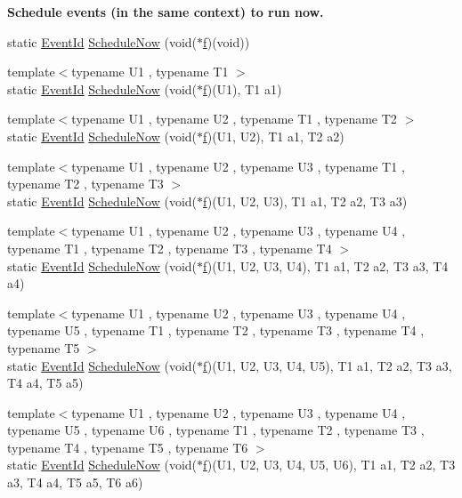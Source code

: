 \begin{Indent}{\bf Schedule events (in the same context) to run now.}
\begin{DoxyCompactItemize}
\item 
static \hyperlink{classns3_1_1EventId}{Event\+Id} \hyperlink{classns3_1_1Simulator_a2eb3f0a7ae370cc88a0dd3416a54a77c}{Schedule\+Now} (void($\ast$\hyperlink{80211b_8c_ae7ffc1a8f84fa47a0812b2f2b9627132}{f})(void))
\item 
{\footnotesize template$<$typename U1 , typename T1 $>$ }\\static \hyperlink{classns3_1_1EventId}{Event\+Id} \hyperlink{classns3_1_1Simulator_a1f80a7e89f6f5aa492f3f58d1d8c5e8e}{Schedule\+Now} (void($\ast$\hyperlink{80211b_8c_ae7ffc1a8f84fa47a0812b2f2b9627132}{f})(U1), T1 a1)
\item 
{\footnotesize template$<$typename U1 , typename U2 , typename T1 , typename T2 $>$ }\\static \hyperlink{classns3_1_1EventId}{Event\+Id} \hyperlink{classns3_1_1Simulator_ae917d38b9c52c0534c6c06ea944aa389}{Schedule\+Now} (void($\ast$\hyperlink{80211b_8c_ae7ffc1a8f84fa47a0812b2f2b9627132}{f})(U1, U2), T1 a1, T2 a2)
\item 
{\footnotesize template$<$typename U1 , typename U2 , typename U3 , typename T1 , typename T2 , typename T3 $>$ }\\static \hyperlink{classns3_1_1EventId}{Event\+Id} \hyperlink{classns3_1_1Simulator_a5fa58442cfe84091af76134d4af42384}{Schedule\+Now} (void($\ast$\hyperlink{80211b_8c_ae7ffc1a8f84fa47a0812b2f2b9627132}{f})(U1, U2, U3), T1 a1, T2 a2, T3 a3)
\item 
{\footnotesize template$<$typename U1 , typename U2 , typename U3 , typename U4 , typename T1 , typename T2 , typename T3 , typename T4 $>$ }\\static \hyperlink{classns3_1_1EventId}{Event\+Id} \hyperlink{classns3_1_1Simulator_a6ac888934ee03111713d5b74e46cb242}{Schedule\+Now} (void($\ast$\hyperlink{80211b_8c_ae7ffc1a8f84fa47a0812b2f2b9627132}{f})(U1, U2, U3, U4), T1 a1, T2 a2, T3 a3, T4 a4)
\item 
{\footnotesize template$<$typename U1 , typename U2 , typename U3 , typename U4 , typename U5 , typename T1 , typename T2 , typename T3 , typename T4 , typename T5 $>$ }\\static \hyperlink{classns3_1_1EventId}{Event\+Id} \hyperlink{classns3_1_1Simulator_a26d22ae03c31b895901c9f3651a8ae17}{Schedule\+Now} (void($\ast$\hyperlink{80211b_8c_ae7ffc1a8f84fa47a0812b2f2b9627132}{f})(U1, U2, U3, U4, U5), T1 a1, T2 a2, T3 a3, T4 a4, T5 a5)
\item 
{\footnotesize template$<$typename U1 , typename U2 , typename U3 , typename U4 , typename U5 , typename U6 , typename T1 , typename T2 , typename T3 , typename T4 , typename T5 , typename T6 $>$ }\\static \hyperlink{classns3_1_1EventId}{Event\+Id} \hyperlink{classns3_1_1Simulator_a3a831f4aaa773769da7ae3edf3f254c7}{Schedule\+Now} (void($\ast$\hyperlink{80211b_8c_ae7ffc1a8f84fa47a0812b2f2b9627132}{f})(U1, U2, U3, U4, U5, U6), T1 a1, T2 a2, T3 a3, T4 a4, T5 a5, T6 a6)
\end{DoxyCompactItemize}
\end{Indent}
